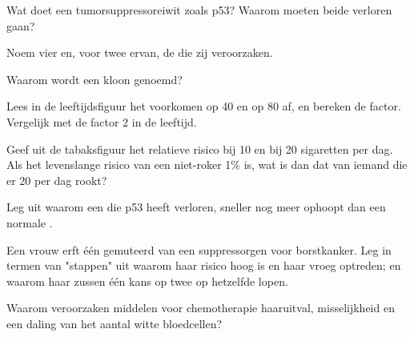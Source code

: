 \begin{exercise}[$\star$]\label{exo:g11:cancer:3}
Wat doet een tumorsuppressoreiwit zoals p53? Waarom moeten beide 
verloren gaan?
\end{exercise}

\begin{exercise}[$\star$]\label{exo:g11:cancer:4}
Noem vier  en, voor twee ervan, de  die zij
veroorzaken.
\end{exercise}

\begin{exercise}[$\star$]\label{exo:g11:cancer:5}
Waarom wordt  een kloon genoemd?
\end{exercise}

\begin{exercise}[$\star\star$]\label{exo:g11:cancer:6}
Lees in de leeftijdsfiguur het voorkomen op 40 en op 80 af, en bereken de
factor. Vergelijk met de factor 2 in de leeftijd.
\end{exercise}

\begin{exercise}[$\star\star$]\label{exo:g11:cancer:7}
Geef uit de tabaksfiguur het relatieve risico bij 10 en bij 20 sigaretten
per dag. Als het levenslange risico van een niet-roker 1\% is, wat is dan
dat van iemand die er 20 per dag rookt?
\end{exercise}

\begin{exercise}[$\star\star$]\label{exo:g11:cancer:8}
Leg uit waarom een  die p53 heeft verloren, sneller nog meer 
ophoopt dan een normale .
\end{exercise}

\begin{exercise}[$\star\star$]\label{exo:g11:cancer:9}
Een vrouw erft één gemuteerd  van een suppressorgen voor
borstkanker. Leg in termen van "stappen" uit waarom haar risico hoog is
en haar  vroeg optreden; en waarom haar zussen één kans op twee op
hetzelfde lopen.
\end{exercise}

\begin{exercise}[$\star\star$]\label{exo:g11:cancer:10}
Waarom veroorzaken middelen voor chemotherapie haaruitval, misselijkheid
en een daling van het aantal witte bloedcellen?
\end{exercise}

